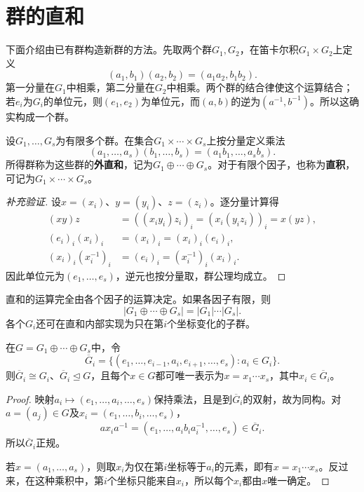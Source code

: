 \section{群的直和}

下面介绍由已有群构造新群的方法。先取两个群$G_1,G_2$，在笛卡尔积$G_1\times G_2$上定义
\[
(a_1,b_1)(a_2,b_2)=(a_1a_2,b_1b_2).
\]
第一分量在$G_1$中相乘，第二分量在$G_2$中相乘。两个群的结合律使这个运算结合；若$e_i$为$G_i$的单位元，则$(e_1,e_2)$为单位元，而$(a,b)$的逆为$(a^{-1},b^{-1})$。所以这确实构成一个群。

\begin{definition}
设$G_1,\ldots,G_s$为有限多个群。在集合$G_1\times\cdots\times G_s$上按分量定义乘法
\[
(a_1,\ldots,a_s)(b_1,\ldots,b_s)=(a_1b_1,\ldots,a_sb_s).
\]
所得群称为这些群的\textbf{外直和}，记为$G_1\oplus\cdots\oplus G_s$。对于有限个因子，也称为\textbf{直积}，可记为$G_1\times\cdots\times G_s$。
\end{definition}
\begin{proof}[补充验证]
设$x=(x_i)$、$y=(y_i)$、$z=(z_i)$。逐分量计算得
\begin{align*}
(xy)z&=((x_iy_i)z_i)_i=(x_i(y_iz_i))_i=x(yz),\\
(e_i)_i(x_i)_i&=(x_i)_i=(x_i)_i(e_i)_i,\\
(x_i)_i(x_i^{-1})_i&=(e_i)_i=(x_i^{-1})_i(x_i)_i.
\end{align*}
因此单位元为$(e_1,\ldots,e_s)$，逆元也按分量取，群公理均成立。
\end{proof}

直和的运算完全由各个因子的运算决定。如果各因子有限，则
\[
|G_1\oplus\cdots\oplus G_s|=|G_1|\cdots|G_s|.
\]
各个$G_i$还可在直和内部实现为只在第$i$个坐标变化的子群。

\begin{proposition}
在$G=G_1\oplus\cdots\oplus G_s$中，令
\[
\overline G_i=\{(e_1,\ldots,e_{i-1},a_i,e_{i+1},\ldots,e_s):a_i\in G_i\}.
\]
则$\overline G_i\cong G_i$、$\overline G_i\trianglelefteq G$，且每个$x\in G$都可唯一表示为$x=x_1\cdots x_s$，其中$x_i\in\overline G_i$。
\end{proposition}
\begin{proof}
映射$a_i\mapsto(e_1,\ldots,a_i,\ldots,e_s)$保持乘法，且是到$\overline G_i$的双射，故为同构。对$a=(a_j)\in G$及$x_i=(e_1,\ldots,b_i,\ldots,e_s)$，
\[
ax_ia^{-1}=(e_1,\ldots,a_ib_ia_i^{-1},\ldots,e_s)\in\overline G_i.
\]
所以$\overline G_i$正规。

若$x=(a_1,\ldots,a_s)$，则取$x_i$为仅在第$i$坐标等于$a_i$的元素，即有$x=x_1\cdots x_s$。反过来，在这种乘积中，第$i$个坐标只能来自$x_i$，所以每个$x_i$都由$x$唯一确定。
\end{proof}

